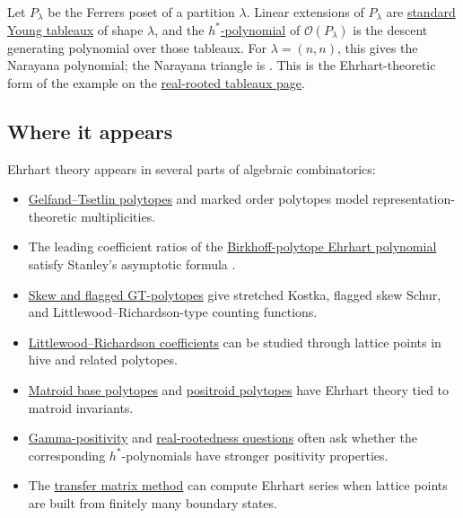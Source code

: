 \begin{example}
Let \(P_\lambda\) be the Ferrers poset of a partition \(\lambda\).  Linear
extensions of \(P_\lambda\) are
\hyperref[standardYoungTableau]{standard Young tableaux} of shape \(\lambda\),
and the \hyperref[hStarPolynomial]{\(h^*\)-polynomial} of
\(\mathcal O(P_\lambda)\) is the descent
generating polynomial over those tableaux.  For \(\lambda=(n,n)\), this gives
the Narayana polynomial; the Narayana triangle is .  This is
the Ehrhart-theoretic form of the example on the
\hyperref[realRootedTableaux]{real-rooted tableaux page}.
\end{example}

\subsection[ehrhartWhereItAppears]{Where it appears}

Ehrhart theory appears in several parts of algebraic combinatorics:
\begin{itemize}
\item \hyperref[gtpolytopes]{Gelfand--Tsetlin polytopes} and marked order
polytopes model representation-theoretic multiplicities.
\item The leading coefficient ratios of the
\hyperref[birkhoffPolytopeAsGelfandTsetlin]{Birkhoff-polytope Ehrhart
polynomial} satisfy Stanley's asymptotic formula
\cite{LiuTang2026Birkhoff}.
\item \hyperref[gtKostkaEhrhart]{Skew and flagged GT-polytopes} give
stretched Kostka, flagged skew Schur, and Littlewood--Richardson-type
counting functions.
\item \hyperref[littlewoodRichardsonModels]{Littlewood--Richardson
coefficients} can be studied through lattice points in hive and related
polytopes.
\item \hyperref[matroidBasePolytope]{Matroid base polytopes} and
\hyperref[positroidPolytopes]{positroid polytopes} have Ehrhart theory tied
to matroid invariants.
\item \hyperref[gammaPositivity]{Gamma-positivity} and
\hyperref[realRootedTableaux]{real-rootedness questions} often ask whether
the corresponding \(h^*\)-polynomials have stronger positivity properties.
\item The \hyperref[transferMatrixMethod]{transfer matrix method} can compute
Ehrhart series when lattice points are built from finitely many boundary
states.
\end{itemize}

